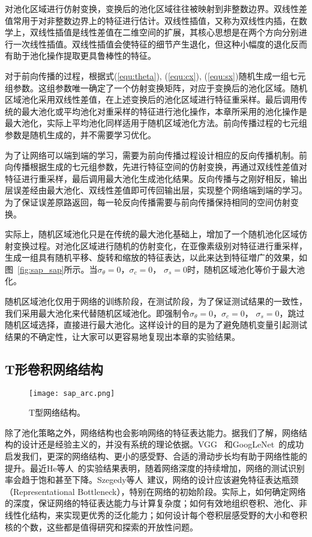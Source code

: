 对池化区域进行仿射变换，变换后的池化区域往往被映射到非整数边界。双线性差值常用于对非整数边界上的特征进行估计。双线性插值，又称为双线性内插，在数学上，双线性插值是线性差值在二维空间的扩展，其核心思想是在两个方向分别进行一次线性插值。双线性插值会使特征的细节产生退化，但这种小幅度的退化反而有助于池化操作提取更具鲁棒性的特征。

对于前向传播的过程，根据式(\ref{equ:theta}), (\ref{equ:cx}), (\ref{equ:sx})随机生成一组七元组参数。这组参数唯一确定了一个仿射变换矩阵，对应于变换后的池化区域。随机区域池化采用双线性差值，在上述变换后的池化区域进行特征重采样。最后调用传统的最大池化或平均池化对重采样的特征进行池化操作，本章所采用的池化操作是最大池化，实际上平均池化同样适用于随机区域池化方法。前向传播过程的七元组参数是随机生成的，并不需要学习优化。

为了让网络可以端到端的学习，需要为前向传播过程设计相应的反向传播机制。前向传播根据生成的七元组参数，先进行特征空间的仿射变换，再通过双线性差值对特征进行重采样，最后调用最大池化生成池化结果。反向传播与之刚好相反，输出层误差经由最大池化、双线性差值即可传回输出层，实现整个网络端到端的学习。为了保证误差原路返回，每一轮反向传播需要与前向传播保持相同的空间仿射变换。

实际上，随机区域池化只是在传统的最大池化基础上，增加了一个随机池化区域仿射变换过程。对池化区域进行随机的仿射变化，在亚像素级别对特征进行重采样，生成一组具有随机平移、旋转和缩放的特征表达，以此来达到特征増广的效果，如图~\ref{fig:sap_sap}所示。当${\sigma_{\theta}=0}$，${\sigma_c=0}$， ${\sigma_s=0}$时，随机区域池化等价于最大池化。

随机区域池化仅用于网络的训练阶段，在测试阶段，为了保证测试结果的一致性，我们采用最大池化来代替随机区域池化。即强制令${\sigma_{\theta}=0}$，${\sigma_c=0}$， ${\sigma_s=0}$，跳过随机区域选择，直接进行最大池化。这样设计的目的是为了避免随机变量引起测试结果的不确定性，让大家可以更容易地复现出本章的实验结果。


\subsection{T形卷积网络结构}
\label{sec:sap:model:t}

\begin{figure} [t]
\centering
\texttt{[image: sap\_arc.png]}
\caption{T型网络结构。}
\label{fig:sap_arc}
\end{figure}

除了池化策略之外，网络结构也会影响网络的特征表达能力。据我们了解，网络结构的设计还是经验主义的，并没有系统的理论依据。VGG~\cite{simonyan2014very} 和GoogLeNet~\cite{szegedy2014going,szegedy2015rethinking,szegedy2016inception}的成功启发我们，更深的网络结构、更小的感受野、合适的滑动步长均有助于网络性能的提升。最近He等人~\cite{he2015deep}的实验结果表明，随着网络深度的持续增加，网络的测试识别率会趋于饱和甚至下降。Szegedy等人~\cite{szegedy2015rethinking}建议，网络的设计应该避免特征表达瓶颈（Representational Bottleneck），特别在网络的初始阶段。实际上，如何确定网络的深度，保证网络的特征表达能力与计算复杂度；如何有效地组织卷积、池化、非线性化结构，来实现更优秀的泛化能力；如何设计每个卷积层感受野的大小和卷积核的个数，这些都是值得研究和探索的开放性问题。

